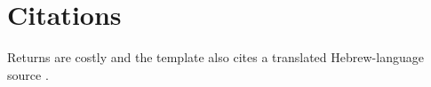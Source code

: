 \documentclass{closettwin}
\begin{document}
\mainmatter
\chapter{Citations}
Returns are costly \cite{gustafsson2021} and the template also cites a translated Hebrew-language source \cite{langtest2024}.
\nocite{*}
\ctreferences
\end{document}
